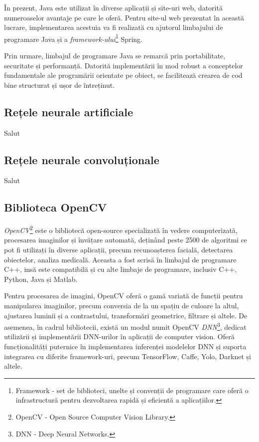 \documentclass[12pt]{article}
\begin{document}
\^{I}n prezent, Java este utilizat \^{i}n diverse aplicații și site-uri web, datorit\u{a} numeroaselor avantaje pe care le ofer\u{a}. Pentru site-ul web prezentat \^{i}n aceast\u{a} lucrare, implementarea acestuia va fi realizat\u{a} cu ajutorul limbajului de programare Java și a \emph{framework-ului}\footnote{Framework - set de biblioteci, unelte și convenții de programare care ofer\u{a} o infrastructur\u{a} pentru dezvoltarea rapid\u{a} și eficient\u{a} a aplicațiilor.} Spring.

Prin urmare, limbajul de programare Java se remarc\u{a} prin portabilitate, securitate și performanț\u{a}. Datorit\u{a} implement\u{a}rii \^{i}n mod robust a conceptelor fundamentale ale program\u{a}rii orientate pe obiect, se faciliteaz\u{a} crearea de cod bine structurat și ușor de \^{i}ntreținut.

\subsection{Rețele neurale artificiale}

Salut

\subsection{Rețele neurale convoluționale}

Salut
\subsection{Biblioteca OpenCV}

\emph{OpenCV}\footnote{OpenCV - Open Source Computer Vision Library.} este o bibliotec\u{a} open-source specializat\u{a} \^{i}n vedere computerizat\u{a}, procesarea imaginilor și \^{i}nv\u{a}țare automat\u{a}, dețin\^{a}nd peste 2500 de algoritmi ce pot fi utilizați \^{i}n diverse aplicații, precum recunoașterea facial\u{a}, detectarea obiectelor, analiza medical\u{a}. Aceasta a fost scris\u{a} \^{i}n limbajul de programare C++, ins\u{a} este compatibil\u{a} și cu alte limbaje de programare, inclusiv C++, Python, Java și Matlab.

Pentru procesarea de imagini, OpenCV ofer\u{a} o gam\u{a} variat\u{a} de funcții pentru manipularea imaginilor, precum conversia de la un spațiu de culoare la altul, ajustarea luminii și a contrastului, transform\u{a}ri geometrice, filtrare și altele. De asemenea, \^{i}n cadrul bibliotecii, exist\u{a} un modul numit OpenCV \emph{DNN}\footnote{DNN - Deep Neural Networks.}, dedicat utiliz\u{a}rii și implement\u{a}rii DNN-urilor \^{i}n aplicații de computer vision. Ofer\u{a} funcționalit\u{a}ți puternice \^{i}n implementarea inferenței modelelor DNN și suporta integrarea cu diferite framework-uri, precum TensorFlow, Caffe, Yolo, Darknet și altele.
\end{document}

